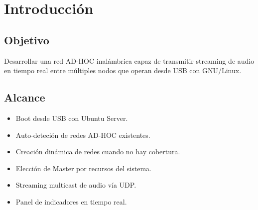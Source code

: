 \chapter{Introducción}

\section{Objetivo}
Desarrollar una red AD-HOC inalámbrica capaz de transmitir streaming de audio en tiempo real entre múltiples nodos que operan desde USB con GNU/Linux.

\section{Alcance}
\begin{itemize}
    \item Boot desde USB con Ubuntu Server.
    \item Auto-deteción de redes AD-HOC existentes.
    \item Creación dinámica de redes cuando no hay cobertura.
    \item Elección de Master por recursos del sistema.
    \item Streaming multicast de audio vía UDP.
    \item Panel de indicadores en tiempo real.
\end{itemize}
